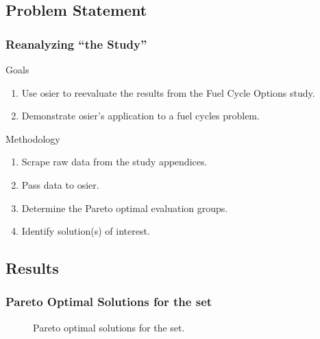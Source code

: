 \subsection{Problem Statement}
\begin{frame}
  \frametitle{Reanalyzing ``the Study''}
  \begin{block}{Goals}
    \begin{enumerate}
      \item Use \gls{osier} to reevaluate the results from the Fuel Cycle Options study.
      \item Demonstrate \gls{osier}'s application to a fuel cycles problem.
    \end{enumerate}
  \end{block}
  \begin{block}{Methodology}
    \begin{enumerate}[<+->]
      \item Scrape raw data from the study appendices.
      \item Pass data to \gls{osier}.
      \item Determine the Pareto optimal evaluation groups.
      \item Identify solution(s) of interest.
    \end{enumerate}
  \end{block}
\end{frame}


\subsection{Results}
\begin{frame}
  \frametitle{Pareto Optimal Solutions for the \gls{set}}
        
  \begin{figure}[htbp!]
    \begin{center}
      \resizebox{0.8\columnwidth}{!}{}
    \end{center}
          \caption{Pareto optimal solutions for the \gls{set}.}
    \label{fig:full-set-pcp}
  \end{figure}
\end{frame}

        

